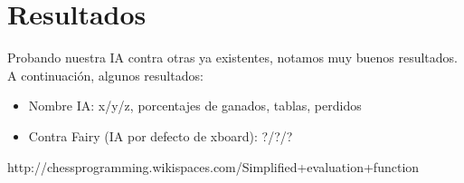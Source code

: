\documentclass{article}
\begin{document}
\section{Resultados}
Probando nuestra IA contra otras ya existentes, notamos muy buenos resultados. A continuación, algunos resultados:

\begin{itemize}
\item Nombre IA: \hfill x/y/z, porcentajes de ganados, tablas, perdidos
\item Contra Fairy (IA por defecto de xboard): \hfill ?/?/?
\end{itemize}


\begin{thebibliography}{9}

  http://chessprogramming.wikispaces.com/Simplified+evaluation+function

\end{thebibliography}
\end{document}
